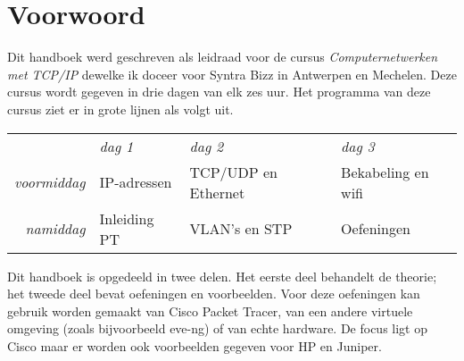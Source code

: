 \section{Voorwoord}

Dit handboek werd geschreven als leidraad voor de cursus \emph{Computernetwerken met TCP/IP} dewelke ik doceer voor Syntra Bizz in Antwerpen en Mechelen.
Deze cursus wordt gegeven in drie dagen van elk zes uur.
Het programma van deze cursus ziet er in grote lijnen als volgt uit.

\begin{center}
   \begin{tabular}{rlll}
                       & \textit{dag 1} & \textit{dag 2}      & \textit{dag 3}     \\[1ex]
   \textit{voormiddag} & IP-adressen    & TCP/UDP en Ethernet & Bekabeling en wifi \\
   \textit{namiddag}   & Inleiding PT   & VLAN's en STP       & Oefeningen         \\
   \end{tabular}
\end{center}

Dit handboek is opgedeeld in twee delen.
Het eerste deel behandelt de theorie; het tweede deel bevat oefeningen en voorbeelden.
Voor deze oefeningen kan gebruik worden gemaakt van Cisco Packet Tracer, van een andere virtuele omgeving (zoals bijvoorbeeld eve-ng) of van echte hardware.
De focus ligt op Cisco maar er worden ook voorbeelden gegeven voor HP en Juniper.